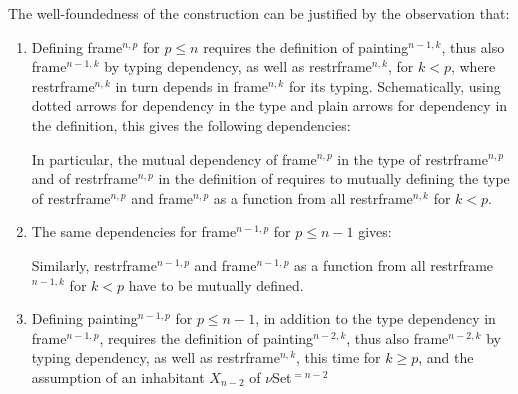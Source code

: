 \documentclass[a4paper,english,cleveref,autoref,thm-restate]{article}
\begin{document}
The well-foundedness of the construction can be justified by the observation that:
\begin{enumerate}
\item Defining frame$^{n,p}$ for $p\leq n$ requires the definition of
  painting$^{n-1,k}$, thus also frame$^{n-1,k}$ by typing dependency,
  as well as restrframe$^{n,k}$, for $k < p$, where restrframe$^{n,k}$
  in turn depends in frame$^{n,k}$ for its typing. Schematically,
  using dotted arrows for dependency in the type and plain arrows for
  dependency in the definition, this gives the following dependencies:
\begin{center}
\end{center}

In particular, the mutual dependency of frame$^{n,p}$ in the type of
restrframe$^{n,p}$ and of restrframe$^{n,p}$ in the definition of
requires to mutually defining the type of restrframe$^{n,p}$
and frame$^{n,p}$ as a function from all restrframe$^{n,k}$ for
$k < p$.

\item The same dependencies for frame$^{n-1,p}$ for $p \leq n-1$ gives:
\begin{center}
\end{center}

Similarly, restrframe$^{n-1,p}$ and frame$^{n-1,p}$ as a function from
all restrframe$^{n-1,k}$ for $k < p$ have to be mutually defined.

\item Defining painting$^{n-1,p}$ for $p\leq n-1$, in addition to the
  type dependency in frame$^{n-1,p}$, requires the definition of
  painting$^{n-2,k}$, thus also frame$^{n-2,k}$ by typing dependency,
  as well as restrframe$^{n,k}$, this time for $k \geq p$, and the
  assumption of an inhabitant $X_{n-2}$ of $\nu$Set$^{=n-2}$
\begin{center}
\end{center}


\end{enumerate}
\end{document}
